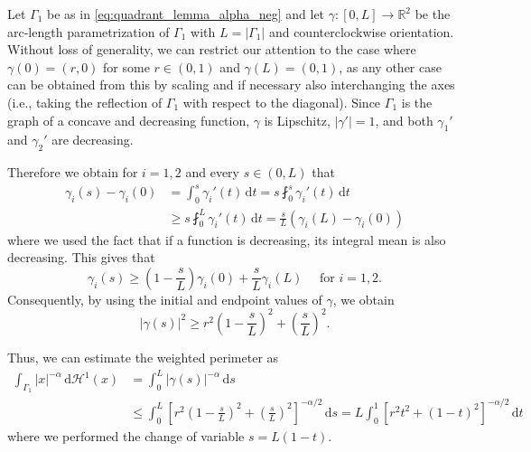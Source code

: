 \documentclass[10pt,leqno]{amsart}
\makeatletter
\newcommand{\R}[0]{\mathbb{R}}
\newcommand{\dd}{\, \mathrm{d}}
\newcommand{\dHo}{\, \mathrm{d} \mathcal{H}^{1}}
\numberwithin{Theorem}{section}
\theoremstyle{definition}
\theoremstyle{remark}
\numberwithin{equation}{section}
\numberwithin{equation}{section}
\newenvironment{customproof}[1]{%
  \par\pushQED{\qed}%
  \normalfont\topsep6pt \trivlist
  \item[\hskip\labelsep\itshape
    Proof of #1\@addpunct{.}]\ignorespaces
}{%
  \popQED\endtrivlist\@endpefalse
}
\makeatother
\begin{document}
\begin{customproof}{Theorem \ref{thm:intro:alpha and n is 1}}
Let $\Gamma_1$ be as in \eqref{eq:quadrant_lemma_alpha_neg} and let $\gamma:[0, L] \to \R^2$ be the arc-length parametrization of $\Gamma_1$ with $L=|\Gamma_1|$ and
counterclockwise orientation. Without loss of generality, we can restrict our attention to the case where $\gamma(0)=(r,0)$ for some $r \in (0,1)$ and $\gamma(L)=(0,1)$, as any other case can be obtained from this by scaling and if necessary also interchanging the axes (i.e., taking the reflection of $\Gamma_1$ with respect to the diagonal). Since $\Gamma_1$ is the graph of a concave and decreasing function, $\gamma$ is Lipschitz, $|\gamma'|=1$, and both $\gamma_1'$ and $\gamma_2'$ are decreasing.






Therefore we obtain for $i=1,2$ and every $s \in (0,L)$ that
    \begin{align*}
        \gamma_i(s)-\gamma_i(0)&=\int_0^s \gamma_i'(t) \dd t =s \fint_0^s \gamma_i'(t) \dd t \\
        &\geq s \fint_0^L \gamma_i'(t) \dd t = \frac{s}{L} \left( \gamma_i(L)-\gamma_i(0)\right)
    \end{align*}
   where we used the fact that if a function is decreasing, its integral mean is also decreasing. This gives that
\begin{equation} \label{prop:geom_est_on_gamma}
\gamma_i(s) \geq \left( 1- \frac{s}{L}\right)\gamma_i(0) + \frac{s}{L} \gamma_i(L)\quad\text{ for }i=1,2.
\end{equation}
Consequently, by using the initial and endpoint values of $\gamma$, we obtain
\begin{equation}
\label{eq:gamma norm Prosenjit estim}
|\gamma(s)|^2 \geq r^2\left(1-\frac{s}{L} \right)^2 +\left(\frac{s}{L}\right)^2.
\end{equation}



Thus, we can estimate the weighted perimeter as 
\begin{align*}
     \int_{\Gamma_1} |x|^{-\alpha} \dHo(x) &=\int_0^{L} |\gamma(s)|^{-\alpha} \dd s \\
     &\leq  \int_0^{L} \left[ r^2\left(1-\frac{s}{L} \right)^2 +\left(\frac{s}{L}\right)^2\right]^{-\alpha/2} \dd s= L\int_0^1 \left[ r^2t^2 +(1-t)^2 \right]^{-\alpha/2} \dd t
\end{align*}
where we performed the change of variable $s=L(1-t)$.


\end{customproof}
\end{document}
